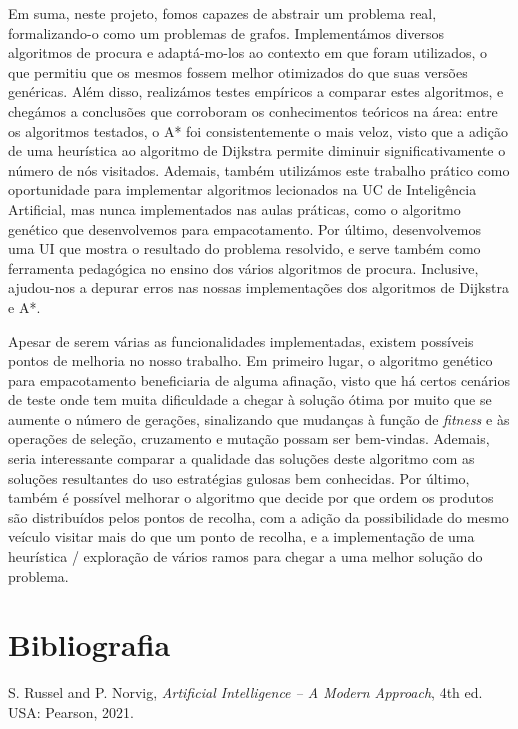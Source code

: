 \documentclass[12pt, a4paper, titlepage]{article}
\begin{document}
Em suma, neste projeto, fomos capazes de abstrair um problema real, formalizando-o como um problemas
de grafos. Implementámos diversos algoritmos de procura e adaptá-mo-los ao contexto em que foram
utilizados, o que permitiu que os mesmos fossem melhor otimizados do que suas versões genéricas.
Além disso, realizámos testes empíricos a comparar estes algoritmos, e chegámos a conclusões que
corroboram os conhecimentos teóricos na área: entre os algoritmos testados, o A* foi
consistentemente o mais veloz, visto que a adição de uma heurística ao algoritmo de Dijkstra permite
diminuir significativamente o número de nós visitados. Ademais, também utilizámos este trabalho
prático como oportunidade para implementar algoritmos lecionados na UC de Inteligência Artificial,
mas nunca implementados nas aulas práticas, como o algoritmo genético que desenvolvemos para
empacotamento. Por último, desenvolvemos uma UI que mostra o resultado do problema resolvido, e
serve também como ferramenta pedagógica no ensino dos vários algoritmos de procura. Inclusive,
ajudou-nos a depurar erros nas nossas implementações dos algoritmos de Dijkstra e A*.

Apesar de serem várias as funcionalidades implementadas, existem possíveis pontos de melhoria no
nosso trabalho. Em primeiro lugar, o algoritmo genético para empacotamento beneficiaria de alguma
afinação, visto que há certos cenários de teste onde tem muita dificuldade a chegar à solução ótima
por muito que se aumente o número de gerações, sinalizando que mudanças à função de \emph{fitness} e
às operações de seleção, cruzamento e mutação possam ser bem-vindas. Ademais, seria interessante
comparar a qualidade das soluções deste algoritmo com as soluções resultantes do uso estratégias
gulosas bem conhecidas. Por último, também é possível melhorar o algoritmo que decide por que ordem
os produtos são distribuídos pelos pontos de recolha, com a adição da possibilidade do mesmo veículo
visitar mais do que um ponto de recolha, e a implementação de uma heurística / exploração de vários
ramos para chegar a uma melhor solução do problema.

\section{Bibliografia}
\def\refname{}
\vspace{-1.5cm}
\begin{thebibliography}{9}
     S. Russel and P. Norvig, \emph{Artificial Intelligence -- A Modern Approach},
        4th ed. USA: Pearson, 2021.
\end{thebibliography}
\end{document}
